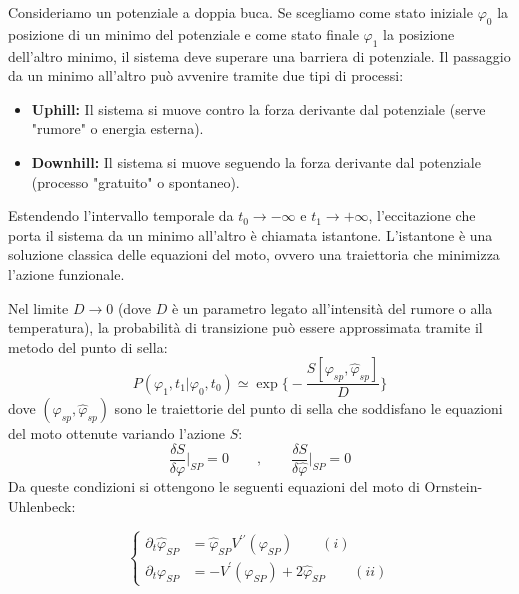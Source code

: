 \noindent Consideriamo un potenziale a doppia buca.
Se scegliamo come stato iniziale $\varphi_0$ la posizione di un minimo del potenziale e come stato finale $\varphi_1$ la posizione dell'altro minimo, il sistema deve superare una barriera di potenziale. Il passaggio da un minimo all'altro può avvenire tramite due tipi di processi:
\begin{itemize}
    \item \textbf{Uphill:} Il sistema si muove contro la forza derivante dal potenziale (serve "rumore" o energia esterna).
    \item \textbf{Downhill:} Il sistema si muove seguendo la forza derivante dal potenziale (processo "gratuito" o spontaneo).
\end{itemize}

Estendendo l'intervallo temporale da $t_0 \rightarrow -\infty$ e $t_1 \rightarrow +\infty$, l'eccitazione che porta il sistema da un minimo all'altro è chiamata istantone. L'istantone è una soluzione classica delle equazioni del moto, ovvero una traiettoria che minimizza l'azione funzionale.

Nel limite $D \rightarrow 0$ (dove $D$ è un parametro legato all'intensità del rumore o alla temperatura), la probabilità di transizione può essere approssimata tramite il metodo del punto di sella:
\begin{equation}
P(\varphi_{1},t_{1}|\varphi_{0},t_{0})\simeq \exp \Biggl\{-\frac{S[\varphi_{sp},\hat{\varphi}_{sp}]}{D} \Biggr\}
\end{equation}
dove $(\varphi_{sp},\hat{\varphi}_{sp})$ sono le traiettorie del punto di sella che soddisfano le equazioni del moto ottenute variando l'azione $S$:
\begin{equation}
\frac{\delta S}{\delta\varphi}\Bigg|_{SP}=0 \quad  \quad , \quad  \quad\frac{\delta S}{\delta\hat{\varphi}}\Bigg|_{SP}=0
\end{equation}
Da queste condizioni si ottengono le seguenti equazioni del moto di Ornstein-Uhlenbeck:

\begin{tcolorbox}[colback=colorA!5, colframe=colorA, arc=3mm, boxrule=1.2pt]
\begin{equation}
\begin{cases} 
\partial_{t} \hat{\varphi}_{SP}  &= \hat{\varphi}_{SP} V^{\prime\prime}(\varphi_{SP})     \quad \quad(i)\\  
\partial_{t} \varphi_{SP}  &= - V^{\prime}(\varphi_{SP}) +2 \hat{\varphi}_{SP}   \quad \quad(ii)   
\end{cases}
\end{equation}
\end{tcolorbox}

